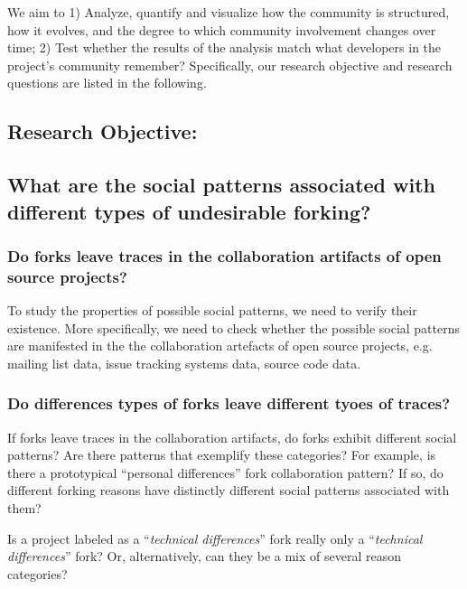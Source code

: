 \documentclass{acm_proc_article-sp}
\begin{document}
We aim to 1) Analyze, quantify and visualize how the community is structured, how it evolves, and the degree to which community involvement changes over time; 2) Test whether the results of the analysis match what developers in the project's community remember? 
Specifically, our research objective and research questions are listed in the following.\\

\subsection{Research Objective:}
\label{ResearchObjective}
\subsection*{What are the social patterns associated with different types of undesirable forking?\\}

\subsubsection{Do forks leave traces in the collaboration artifacts of open source projects?\\}

To study the properties of possible social patterns, we need to verify their existence. More specifically, we need to check whether the possible social patterns are manifested in the the collaboration artefacts of open source projects, e.g. mailing list data, issue tracking systems data, source code data.

\subsubsection{Do differences types of forks leave different tyoes of traces?\\}

If forks leave traces in the collaboration artifacts, do forks exhibit different social patterns? Are there patterns that exemplify these categories? For example, is there a prototypical ``personal differences'' fork collaboration pattern? If so, do different forking reasons have distinctly different social patterns associated with them? 

Is a project labeled as a ``\textit{technical differences}'' fork really only a ``\textit{technical differences}'' fork? Or, alternatively, can they be a mix of several reason categories?
\end{document}
